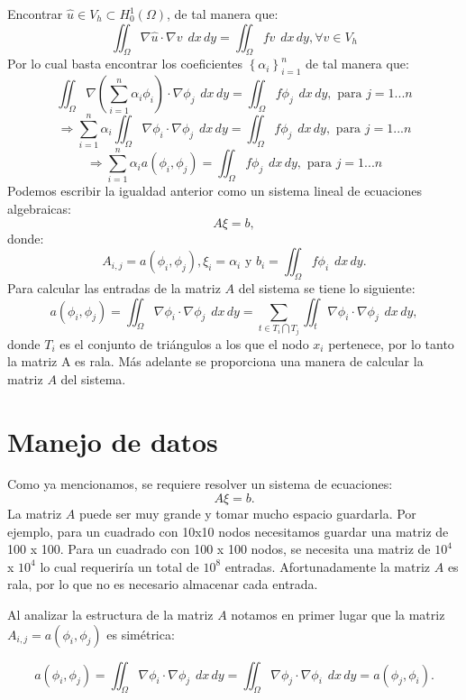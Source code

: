 \documentclass[12pt,spanish,oneside]{book}
\theoremstyle{plain}
\numberwithin{equation}{chapter}
\theoremstyle{definition}
\theoremstyle{remark}
\newcommand{\dxy}{\hspace{5pt} dx\hspace{2pt} dy }
\newcommand{\intomega}[1]{\iint_\Omega #1 \dxy} %
\newcommand{\llaves}[1]{\left\lbrace #1\right\rbrace}
\begin{document}
Encontrar $\hat{u}\in V_h \subset H_0^1(\Omega)$, de tal manera que:
\[\iint_\Omega \nabla \hat{u}\cdot \nabla v \dxy = \iint_\Omega f v\dxy, \forall v \in V_h \]
Por lo cual basta encontrar los coeficientes $\llaves{\alpha_i}_{i=1}^n$ de tal manera que:
\[\iint_\Omega \nabla\left( \sum_{i=1}^n \alpha_i \phi_i\right) \cdot \nabla \phi_j \dxy = \iint_\Omega f \phi_j\dxy, \text{ para } j=1...n \]
\[\Rightarrow \sum_{i=1}^n\alpha_i \intomega{\nabla \phi_i\cdot\nabla \phi_j}=\intomega{f \phi_j}, \text{ para } j=1...n\]
\[\Rightarrow \sum_{i=1}^n\alpha_i a(\phi_i,\phi_j)=\intomega{f \phi_j}, \text{ para } j=1...n\]
Podemos escribir la igualdad anterior como un sistema lineal de ecuaciones algebraicas: 
\begin{equation}
A\xi=b,\label{algebraica}
\end{equation}
donde: \[A_{i,j}=a(\phi_i,\phi_j), \xi_i=\alpha_i\text{ y } b_i=\intomega{f\phi_i}.\]
Para calcular las entradas de la matriz $A$ del sistema se tiene lo siguiente:
\[ a(\phi_i,\phi_j)=\iint_\Omega \nabla\phi_i\cdot \nabla \phi_j \dxy =\sum_{t\in T_i\bigcap T_j} \iint_{t} \nabla\phi_i\cdot \nabla \phi_j\dxy,\]
donde $T_i$ es el conjunto de triángulos a los que el nodo $x_i$ pertenece, por lo tanto la matriz A es rala. Más adelante se proporciona una manera de calcular la matriz $A$ del sistema.

 

\section{Manejo de datos}

Como ya mencionamos, se requiere resolver un sistema de ecuaciones:
\begin{equation}\label{sisteq}
  A\xi=b.
\end{equation}
La matriz $A$ puede ser muy grande y tomar mucho espacio guardarla. Por ejemplo, para un cuadrado con 10x10 nodos necesitamos guardar una matriz de 100 x 100. Para un cuadrado con 100 x 100 nodos, se necesita una matriz de $10^4$ x $10^4$ lo cual requeriría un total de $10^8$ entradas. Afortunadamente la matriz $A$ es rala, por lo que no es necesario almacenar cada entrada.

Al analizar la estructura de la matriz $A$ notamos en primer lugar que la matriz $A_{i,j}=a(\phi_i,\phi_j)$ es simétrica:

\[ a(\phi_i,\phi_j)=\iint_\Omega \nabla \phi_i \cdot \nabla \phi_j \dxy = \iint_\Omega \nabla \phi_j \cdot \nabla \phi_i \dxy=a(\phi_j,\phi_i). \]
\end{document}

